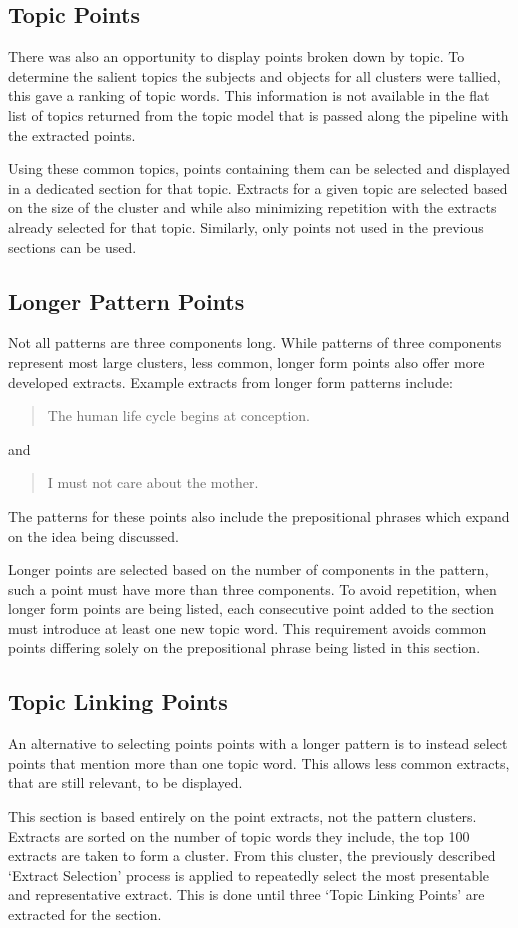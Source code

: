    \subsection{Topic Points}
      There was also an opportunity to display points broken down by topic. To determine the salient topics the subjects and objects for all clusters were tallied, this gave a ranking of topic words. This information is not available in the flat list of topics returned from the topic model that is passed along the pipeline with the extracted points.

      Using these common topics, points containing them can be selected and displayed in a dedicated section for that topic. Extracts for a given topic are selected based on the size of the cluster and while also minimizing repetition with the extracts already selected for that topic. Similarly, only points not used in the previous sections can be used.

    \subsection{Longer Pattern Points}
      Not all patterns are three components long. While patterns of three components represent most large clusters, less common, longer form points also offer more developed extracts. Example extracts from longer form patterns include: \blockquote{The human life cycle begins at conception.} and \blockquote{I must not care about the mother.}. The patterns for these points also include the prepositional phrases which expand on the idea being discussed.

      Longer points are selected based on the number of components in the pattern, such a point must have more than three components. To avoid repetition, when longer form points are being listed, each consecutive point added to the section must introduce at least one new topic word. This requirement avoids common points differing solely on the prepositional phrase being listed in this section.

    \subsection{Topic Linking Points}
      An alternative to selecting points points with a longer pattern is to instead select points that mention more than one topic word. This allows less common extracts, that are still relevant, to be displayed.

      This section is based entirely on the point extracts, not the pattern clusters. Extracts are sorted on the number of topic words they include, the top 100 extracts are taken to form a cluster. From this cluster, the previously described `Extract Selection' process is applied to repeatedly select the most presentable and representative extract. This is done until three `Topic Linking Points' are extracted for the section.

